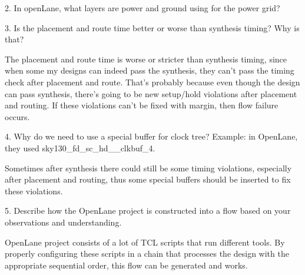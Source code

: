 \documentclass[a4paper]{article}
\begin{document}
2. In openLane, what layers are power and ground using for the power grid?

3. Is the placement and route time better or worse than synthesis timing? Why is that?

The placement and route time is worse or stricter than synthesis timing, since when some my designs can indeed pass the synthesis, they can't pass the timing check after placement and route. That's probably because even though the design can pass synthesis, there's going to be new setup/hold violations after placement and routing. If these violations can't be fixed with margin, then flow failure occurs. 

4. Why do we need to use a special buffer for clock tree? Example: in OpenLane, they used sky130\_fd\_sc\_hd\_\_clkbuf\_4.

Sometimes after synthesis there could still be some timing violations, especially after placement and routing, thus some special buffers should be inserted to fix these violations. 

5. Describe how the OpenLane project is constructed into a flow based on your observations and understanding.

OpenLane project consists of a lot of TCL scripts that run different tools. By properly configuring these scripts in a chain that processes the design with the appropriate sequential order, this flow can be generated and works. 
\end{document}
